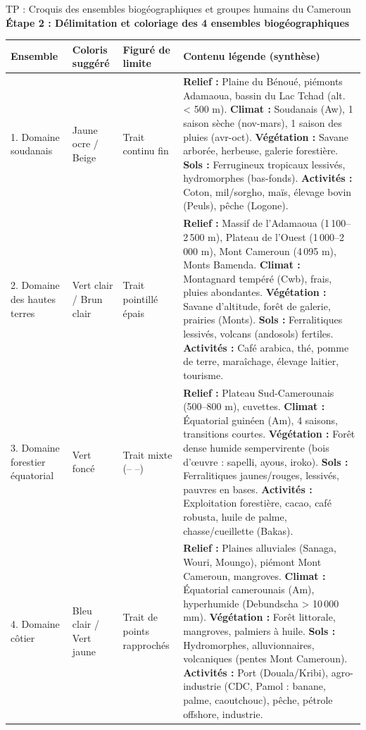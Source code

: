 \documentclass[11pt]{article}
\begin{document}
\begin{exoresolu}{TP : Croquis des ensembles biogéographiques et groupes humains du Cameroun}
\textbf{Étape 2 : Délimitation et coloriage des 4 ensembles biogéographiques}
\begin{center}
\begin{tabularx}{\linewidth}{|l|X|X|X|}\hline
\rowcolor{popblueL}
\textbf{Ensemble} & \textbf{Coloris suggéré} & \textbf{Figuré de limite} & \textbf{Contenu légende (synthèse)} \\ \hline
1. Domaine soudanais & Jaune ocre / Beige & Trait continu fin & \textbf{Relief :} Plaine du Bénoué, piémonts Adamaoua, bassin du Lac Tchad (alt. < 500 m). \textbf{Climat :} Soudanais (Aw), 1 saison sèche (nov-mars), 1 saison des pluies (avr-oct). \textbf{Végétation :} Savane arborée, herbeuse, galerie forestière. \textbf{Sols :} Ferrugineux tropicaux lessivés, hydromorphes (bas-fonds). \textbf{Activités :} Coton, mil/sorgho, maïs, élevage bovin (Peuls), pêche (Logone). \\ \hline
2. Domaine des hautes terres & Vert clair / Brun clair & Trait pointillé épais & \textbf{Relief :} Massif de l'Adamaoua (1\,100--2\,500 m), Plateau de l'Ouest (1\,000--2\,000 m), Mont Cameroun (4\,095 m), Monts Bamenda. \textbf{Climat :} Montagnard tempéré (Cwb), frais, pluies abondantes. \textbf{Végétation :} Savane d'altitude, forêt de galerie, prairies (Monts). \textbf{Sols :} Ferralitiques lessivés, volcans (andosols) fertiles. \textbf{Activités :} Café arabica, thé, pomme de terre, maraîchage, élevage laitier, tourisme. \\ \hline
3. Domaine forestier équatorial & Vert foncé & Trait mixte (-- --) & \textbf{Relief :} Plateau Sud-Camerounais (500--800 m), cuvettes. \textbf{Climat :} Équatorial guinéen (Am), 4 saisons, transitions courtes. \textbf{Végétation :} Forêt dense humide sempervirente (bois d'œuvre : sapelli, ayous, iroko). \textbf{Sols :} Ferralitiques jaunes/rouges, lessivés, pauvres en bases. \textbf{Activités :} Exploitation forestière, cacao, café robusta, huile de palme, chasse/cueillette (Bakas). \\ \hline
4. Domaine côtier & Bleu clair / Vert jaune & Trait de points rapprochés & \textbf{Relief :} Plaines alluviales (Sanaga, Wouri, Moungo), piémont Mont Cameroun, mangroves. \textbf{Climat :} Équatorial camerounais (Am), hyperhumide (Debundscha > 10\,000 mm). \textbf{Végétation :} Forêt littorale, mangroves, palmiers à huile. \textbf{Sols :} Hydromorphes, alluvionnaires, volcaniques (pentes Mont Cameroun). \textbf{Activités :} Port (Douala/Kribi), agro-industrie (CDC, Pamol : banane, palme, caoutchouc), pêche, pétrole offshore, industrie. \\ \hline
\end{tabularx}
\end{center}


\end{exoresolu}
\end{document}
